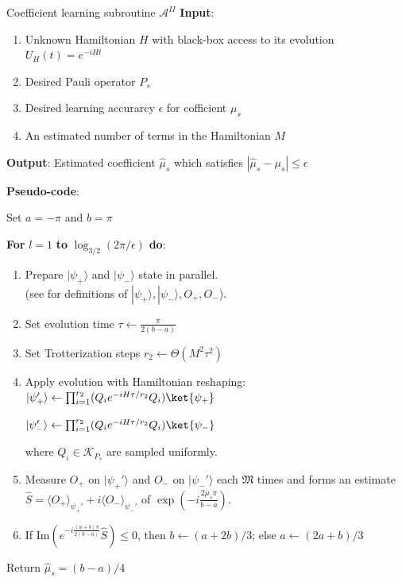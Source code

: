 \documentclass[twocolumn,superscriptaddress,aps,showpacs,amsmath,amstex,amssymb,citeautoscript,floatfix,pra,preprintnumbers]{revtex4-2}
\newcounter{alg}
\theoremstyle{plain}
\theoremstyle{plain}
\theoremstyle{plain}
\theoremstyle{plain}
\theoremstyle{plain}
\theoremstyle{plain}
\begin{document}
\begin{alg}[htbp]{Coefficient learning subroutine $\mathcal{A}^{II}$}
\label{alg:algorithm_II}
\textbf{Input}: \vspace{-2mm}
\begin{enumerate}
    \item Unknown Hamiltonian $H$ with black-box access to its evolution $U_{H}(t)=e^{-iHt}$\vspace{-2mm}
    \item Desired Pauli operator $P_s$\vspace{-2mm}
    \item Desired learning accurarcy $\epsilon$ for cofficient $\mu_s$\vspace{-2mm}
    \item An estimated number of terms in the Hamiltonian $M$
\end{enumerate}\vspace{-2mm}

\textbf{Output}: Estimated coefficient $\hat{\mu}_s$ which satisfies $|\hat{\mu}_s-\mu_s|\leq \epsilon$\vspace{2mm}

\textbf{Pseudo-code}:

Set $a=-\pi$ and $b=\pi$

\textbf{For} $l = 1$ \textbf{to}
 $\log_{3/2}(2\pi/\epsilon)$ \textbf{do}:\vspace{-2mm}
    \begin{enumerate}
        \item Prepare $|\psi_{+}\rangle$ and $|\psi_{-}\rangle$ state in parallel. \\(see  for definitions of $|\psi_{+}\rangle,|\psi_{-}\rangle,O_+,O_-$).\vspace{-0mm}
        \item Set evolution time $\tau \gets \frac{\pi}{2(b-a)}$
        \item Set Trotterization steps $r_2\gets \Theta(M^2\tau^2)$
        \item Apply evolution with Hamiltonian reshaping: \\
        $|\psi_{+}'\rangle \gets \prod_{i=1}^{r_2}(Q_ie^{-iH\tau/r_2}Q_i)\ket{\psi_+}$
    
        $|\psi_{-}'\rangle \gets \prod_{i=1}^{r_2}(Q_ie^{-iH\tau/r_2}Q_i)\ket{\psi_-}$
        
        where $Q_i\in \mathcal{K}_{P_s}$ are sampled uniformly.
        \item Measure $O_+$ on $|\psi_{+}'\rangle$ and $O_-$ on $|\psi_{-}'\rangle$ each $\mathfrak{M}$ times and forms an estimate $\hat{S}=\langle O_{+}\rangle_{\psi_+'}+i\langle O_-\rangle_{\psi_-'}$ of $\exp(-i \frac{2\mu_s\pi}{b-a})$.
        \item If $\text{Im}\left(e^{-i\frac{(a+b)\pi}{2(b-a)}}\hat{S}\right)\leq 0$, then $b\gets (a+2b)/3$; else $a\gets (2a+b)/3$
    \end{enumerate}
Return $\hat{\mu}_s=(b-a)/4$
\end{alg}
\end{document}
